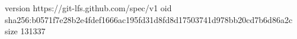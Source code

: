 version https://git-lfs.github.com/spec/v1
oid sha256:b0571f7e28b2e4fdef1666ac195fd31d8fd8d17503741d978bb20cd7b6d86a2c
size 131337
